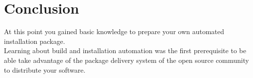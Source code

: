 \newpage





\section{Conclusion}

At this point you gained basic knowledge to prepare your own automated installation package. \\
Learning about build and installation automation was the first prerequisite to be able take advantage of the package delivery system of the open source community
to distribute your software. 
